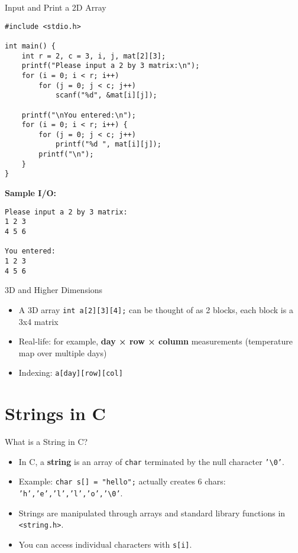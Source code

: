 \documentclass[12pt, aspectratio=169]{beamer}
\begin{document}
    \begin{frame}[fragile]{Input and Print a 2D Array}
        \begin{verbatim}
#include <stdio.h>

int main() {
    int r = 2, c = 3, i, j, mat[2][3];
    printf("Please input a 2 by 3 matrix:\n");
    for (i = 0; i < r; i++)
        for (j = 0; j < c; j++)
            scanf("%d", &mat[i][j]);

    printf("\nYou entered:\n");
    for (i = 0; i < r; i++) {
        for (j = 0; j < c; j++)
            printf("%d ", mat[i][j]);
        printf("\n");
    }
}
        \end{verbatim}

        \textbf{Sample I/O:}
\begin{verbatim}
Please input a 2 by 3 matrix:
1 2 3
4 5 6

You entered:
1 2 3
4 5 6
\end{verbatim}
    \end{frame}

    \begin{frame}{3D and Higher Dimensions}
        \begin{itemize}
            \item A 3D array \texttt{int a[2][3][4];} can be thought of as 2 blocks, each block is a 3x4 matrix
            \item Real-life: for example, \textbf{day × row × column} measurements (temperature map over multiple days)
            \item Indexing: \texttt{a[day][row][col]}
        \end{itemize}
    \end{frame}


    \section{Strings in C}


    \begin{frame}{What is a String in C?}
        \begin{itemize}
            \item In C, a \textbf{string} is an array of \texttt{char} terminated by the null character \texttt{'\textbackslash0'}.
            \item Example: \texttt{char s[] = "hello";} actually creates 6 chars: \texttt{'h','e','l','l','o','\textbackslash0'}.
            \item Strings are manipulated through arrays and standard library functions in \texttt{<string.h>}.
            \item You can access individual characters with \texttt{s[i]}.
        \end{itemize}
    \end{frame}
\end{document}
